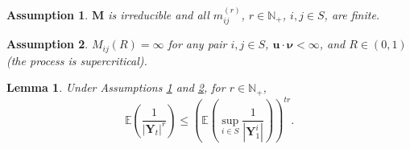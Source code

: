 \documentclass[10pt,a4paper]{amsart}
\newtheorem{assumption}{Assumption}
\newtheorem{lemma}{Lemma}
\begin{document}
\begin{assumption}\label{infinite_matrix}
    $\boldsymbol{M}$ is irreducible and all $m_{ij}^{(r)}$, $r \in \mathbb{N}_+$, $i,j \in S$, are finite.
\end{assumption}

\begin{assumption}\label{R-positive}
  $M_{ij}(R) = \infty$ for any pair $i,j \in S$, $\boldsymbol{u} \cdot\boldsymbol{\nu} < \infty$, and $R \in (0, 1)$ (the process is supercritical).
\end{assumption}

\begin{lemma}\label{y_upper}
Under Assumptions \ref{infinite_matrix} and \ref{R-positive}, for $r\in\mathbb{N}_+$, %
    \begin{equation*}
       \mathbb{E}\left(\frac{1}{|\boldsymbol{Y}_t|^r}\right) \le   \left(\mathbb{E}\left(\sup_{i \in S}\frac{1}{|\boldsymbol{Y}_{1}^{i}|}\right)\right)^{tr} .
    \end{equation*}
\end{lemma}
\end{document}
